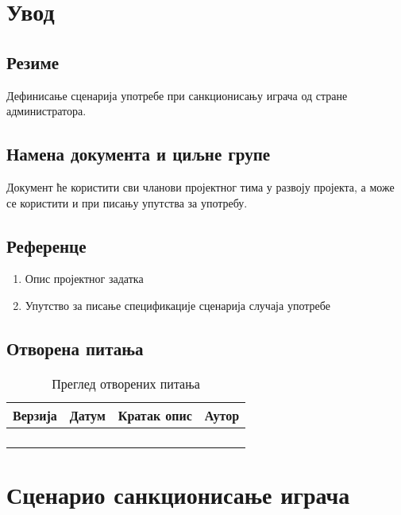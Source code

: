 \section{Увод}

\subsection{Резиме}
Дефинисање сценарија употребе при санкционисању играча од стране администратора.

\subsection{Намена документа и циљне групе}
Документ ће користити сви чланови пројектног тима у развоју пројекта, а може се 
користити и при писању упутства за употребу.

\subsection{Референце}
\begin{enumerate}
	\item Опис пројектног задатка
	\item Упутство за писање спецификације сценарија случаја употребе
\end{enumerate}

\subsection{Отворена питања}
\begin{table}[h!]
\centering
	
	\begin{tabu}{ || X[l] | X[l] | X[l] | X[l] || }
	\hline
	\textbf{Верзија} & \textbf{Датум} & \textbf{Кратак опис} & \textbf{Аутор} \\
	\hline
	\hline
	& & &\\
	\hline
	& & &\\
	\hline
	& & &\\
	\hline
	& & &\\
	\hline
	\end{tabu}
	\caption{Преглед отворених питања}
	\label{table:2}
		
\end{table}



\section{Сценарио санкционисање играча}

